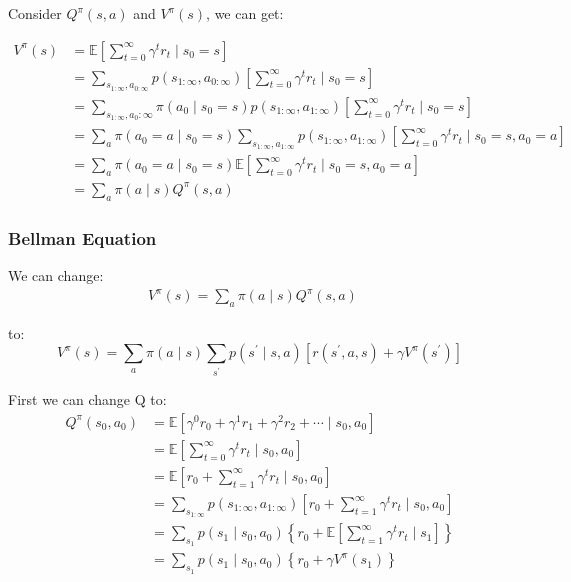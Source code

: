 \documentclass[11pt]{article}
\begin{document}
Consider $Q^{\pi}(s, a)$ and $V^{\pi}(s)$, we can get:

\begin{align*}
V^{\pi}(s) &=\mathbb{E}\left[\sum_{t=0}^{\infty} \gamma^{t} r_{t} \mid s_{0}=s\right] \\
&=\sum_{s_{1: \infty}, a_{0: \infty}} p\left(s_{1: \infty}, a_{0: \infty}\right)\left[\sum_{t=0}^{\infty} \gamma^{t} r_{t} \mid s_{0}=s\right] \\
&=\sum_{s_{1: \infty}, a_{0}: \infty} \pi\left(a_{0} \mid s_{0}=s\right) p\left(s_{1: \infty}, a_{1: \infty}\right)\left[\sum_{t=0}^{\infty} \gamma^{t} r_{t} \mid s_{0}=s\right] \\
&=\sum_{a} \pi\left(a_{0}=a \mid s_{0}=s\right) \sum_{s_{1: \infty}, a_{1: \infty}} p\left(s_{1: \infty}, a_{1: \infty}\right)\left[\sum_{t=0}^{\infty} \gamma^{t} r_{t} \mid s_{0}=s, a_{0}=a\right] \\
&=\sum_{a} \pi\left(a_{0}=a \mid s_{0}=s\right) \mathbb{E}\left[\sum_{t=0}^{\infty} \gamma^{t} r_{t} \mid s_{0}=s, a_{0}=a\right] \\
&=\sum_{a} \pi(a \mid s) Q^{\pi}(s, a) \quad
\end{align*}



\subsubsection{Bellman Equation}

We can change:
\begin{align*}
V^{\pi}(s) =\sum_{a} \pi(a \mid s) Q^{\pi}(s, a) \quad
\end{align*}

to:
\begin{equation}
V^{\pi}(s)=\sum_{a} \pi(a \mid s) \sum_{s^{\prime}} p\left(s^{\prime} \mid s, a\right)\left[r\left(s^{\prime}, a, s\right)+\gamma V^{\pi}\left(s^{\prime}\right)\right]
\end{equation}

First we can change Q to:
\begin{align*}
Q^{\pi}\left(s_{0}, a_{0}\right) &=\mathbb{E}\left[\gamma^{0} r_{0}+\gamma^{1} r_{1}+\gamma^{2} r_{2}+\cdots \mid s_{0}, a_{0}\right] \\
&=\mathbb{E}\left[\sum_{t=0}^{\infty} \gamma^{t} r_{t} \mid s_{0}, a_{0}\right] \\
&=\mathbb{E}\left[r_{0}+\sum_{t=1}^{\infty} \gamma^{t} r_{t} \mid s_{0}, a_{0}\right] \\
&=\sum_{s_{1: \infty}} p\left(s_{1: \infty}, a_{1: \infty}\right)\left[r_{0}+\sum_{t=1}^{\infty} \gamma^{t} r_{t} \mid s_{0}, a_{0}\right] \\
&=\sum_{s_{1}} p\left(s_{1} \mid s_{0}, a_{0}\right)\left\{r_{0}+\mathbb{E}\left[\sum_{t=1}^{\infty} \gamma^{t} r_{t} \mid s_{1}\right]\right\} \\
&= \sum_{s_{1}} p\left(s_{1} \mid s_{0}, a_{0}\right)\left\{r_{0}+\gamma V^\pi(s_1)\right\} \\
\end{align*}
\end{document}
